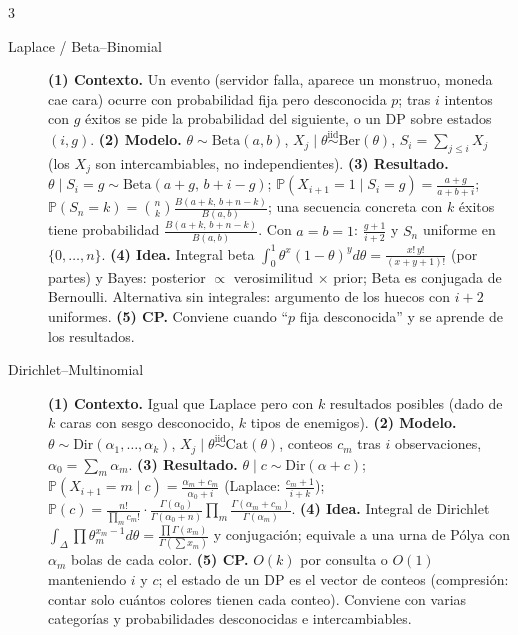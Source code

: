 \documentclass[8pt, spanish, mexico, letterpaper]{extarticle}
\newcommand{\Prob}{\mathbb{P}}
\newcommand{\<}{<}
\begin{document}
\begin{multicols*}{3}
\begin{description}
\item[Laplace / Beta--Binomial] \textbf{(1) Contexto.} Un evento (servidor falla, aparece un monstruo, moneda cae cara) ocurre con probabilidad fija pero desconocida $p$; tras $i$ intentos con $g$ éxitos se pide la probabilidad del siguiente, o un DP sobre estados $(i,g)$. \textbf{(2) Modelo.} $\theta\sim\mathrm{Beta}(a,b)$, $X_j\mid\theta\overset{\mathrm{iid}}{\sim}\mathrm{Ber}(\theta)$, $S_i=\sum_{j\le i}X_j$ (los $X_j$ son intercambiables, no independientes). 
\textbf{(3) Resultado.} 
$\theta\mid S_i{=}g\sim\mathrm{Beta}(a + g,\,b + i - g)$; $\Prob(X_{i+1}{=}1\mid S_i{=}g)=\frac{a+g}{a+b+i}$; $\Prob(S_n{=}k)=\binom nk\frac{B(a+k,\,b+n-k)}{B(a,b)}$; una secuencia concreta con $k$ éxitos tiene probabilidad $\frac{B(a+k,\,b+n-k)}{B(a,b)}$. Con $a{=}b{=}1$: $\frac{g+1}{i+2}$ y $S_n$ uniforme en $\{0,\dots,n\}$. \textbf{(4) Idea.} Integral beta $\int_0^1\theta^x(1 - \theta)^y d\theta=\frac{x!\,y!}{(x+y+1)!}$ (por partes) y Bayes: posterior $\propto$ verosimilitud $\times$ prior; Beta es conjugada de Bernoulli. Alternativa sin integrales: argumento de los huecos con $i + 2$ uniformes. \textbf{(5) CP.}  Conviene cuando ``$p$ fija desconocida'' y se aprende de los resultados.

\item[Dirichlet--Multinomial] \textbf{(1) Contexto.} Igual que Laplace pero con $k$ resultados posibles (dado de $k$ caras con sesgo desconocido, $k$ tipos de enemigos). \textbf{(2) Modelo.} $\theta\sim\mathrm{Dir}(\alpha_1,\dots,\alpha_k)$, $X_j\mid\theta\overset{\mathrm{iid}}{\sim}\mathrm{Cat}(\theta)$, conteos $c_m$ tras $i$ observaciones, $\alpha_0=\sum_m\alpha_m$. \textbf{(3) Resultado.} $\theta\mid c\sim\mathrm{Dir}(\alpha+c)$; $\Prob(X_{i+1}{=}m\mid c)=\frac{\alpha_m+c_m}{\alpha_0+i}$ (Laplace: $\frac{c_m+1}{i+k}$); $\Prob(c)=\frac{n!}{\prod_m c_m!}\cdot\frac{\Gamma(\alpha_0)}{\Gamma(\alpha_0+n)}\prod_m\frac{\Gamma(\alpha_m+c_m)}{\Gamma(\alpha_m)}$. \textbf{(4) Idea.} Integral de Dirichlet $\int_{\Delta}\prod\theta_m^{x_m-1}d\theta=\frac{\prod\Gamma(x_m)}{\Gamma(\sum x_m)}$ y conjugación; equivale a una urna de Pólya con $\alpha_m$ bolas de cada color. \textbf{(5) CP.} $O(k)$ por consulta o $O(1)$ manteniendo $i$ y $c$; el estado de un DP es el vector de conteos (compresión: contar solo cuántos colores tienen cada conteo). Conviene con varias categorías y probabilidades desconocidas e intercambiables.


\end{description}
\end{multicols*}
\end{document}

